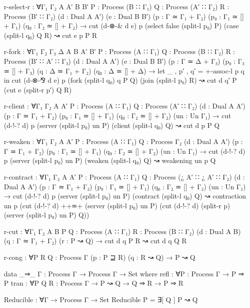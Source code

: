 \begin{code}
  r-select-r :
    ∀{Γ₁ Γ₂ A A′ B B′}
    {P : Process (B ∷ Γ₁)} {Q : Process (A′ ∷ Γ₂)} {R : Process (B′ ∷ Γ₂)}
    (d : Dual A A′) (e : Dual B B′) (p : Γ ≃ Γ₁ + Γ₂) (p₀ : Γ₁ ≃ [] + Γ₁) (q₀ : Γ₂ ≃ [] + Γ₂) →
    cut (d-⊕-& d e) p
        (select false (split-l p₀) P)
        (case (split-l q₀) Q R) ↝ cut e p P R

  r-fork :
    ∀{Γ₁ Γ₂ Γ₃ Δ A B A′ B′}
    {P : Process (A ∷ Γ₁)} {Q : Process (B ∷ Γ₂)} {R : Process (B′ ∷ A′ ∷ Γ₃)}
    (d : Dual A A′) (e : Dual B B′) (p : Γ ≃ Δ + Γ₃) (p₀ : Γ₃ ≃ [] + Γ₃)
    (q : Δ ≃ Γ₁ + Γ₂) (q₀ : Δ ≃ [] + Δ) →
    let _ , p′ , q′ = +-assoc-l p q in
    cut (d-⊗-⅋ d e) p
        (fork (split-l q₀) q P Q)
        (join (split-l p₀) R) ↝ cut d q′ P (cut e (split-r p′) Q R)

  r-client :
    ∀{Γ₁ Γ₂ A A′}
    {P : Process (A ∷ Γ₁)} {Q : Process (A′ ∷ Γ₂)} (d : Dual A A′)
    (p : Γ ≃ Γ₁ + Γ₂) (p₀ : Γ₁ ≃ [] + Γ₁) (q₀ : Γ₂ ≃ [] + Γ₂) (un : Un Γ₁) →
    cut (d-!-? d) p
      (server (split-l p₀) un P)
      (client (split-l q₀) Q) ↝ cut d p P Q

  r-weaken :
    ∀{Γ₁ Γ₂ A A′}
    {P : Process (A ∷ Γ₁)} {Q : Process Γ₂}
    (d : Dual A A′) (p : Γ ≃ Γ₁ + Γ₂) (p₀ : Γ₁ ≃ [] + Γ₁) (q₀ : Γ₂ ≃ [] + Γ₂) (un : Un Γ₁) →
    cut (d-!-? d) p
        (server (split-l p₀) un P)
        (weaken (split-l q₀) Q) ↝ weakening un p Q

  r-contract :
    ∀{Γ₁ Γ₂ A A′}
    {P : Process (A ∷ Γ₁)} {Q : Process (¿ A′ ∷ ¿ A′ ∷ Γ₂)}
    (d : Dual A A′) (p : Γ ≃ Γ₁ + Γ₂) (p₀ : Γ₁ ≃ [] + Γ₁) (q₀ : Γ₂ ≃ [] + Γ₂) (un : Un Γ₁) →
    cut (d-!-? d) p
      (server (split-l p₀) un P)
      (contract (split-l q₀) Q) ↝
      contraction un p
        (cut (d-!-? d) ++≃+
             (server (split-l p₀) un P)
             (cut (d-!-? d) (split-r p) (server (split-l p₀) un P) Q))

  r-cut :
    ∀{Γ₁ Γ₂ A B}
    {P Q : Process (A ∷ Γ₁)} {R : Process (B ∷ Γ₂)}
    (d : Dual A B) (q : Γ ≃ Γ₁ + Γ₂) (r : P ↝ Q) →
    cut d q P R ↝ cut d q Q R

  r-cong :
    ∀{P R Q : Process Γ}
    (p : P ⊒ R) (q : R ↝ Q) → P ↝ Q

data _⇒_ {Γ} : Process Γ → Process Γ → Set where
  refl : ∀{P : Process Γ} → P ⇒ P
  tran : ∀{P Q R : Process Γ} → P ↝ Q → Q ⇒ R → P ⇒ R

Reducible : ∀{Γ} → Process Γ → Set
Reducible P = ∃[ Q ] P ↝ Q
\end{code}